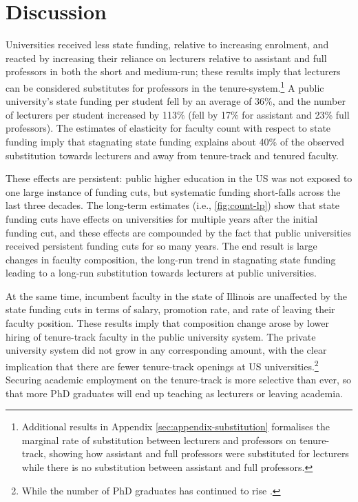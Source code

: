 \section{Discussion}
\label{sec:discussion}

Universities received less state funding, relative to increasing enrolment, and reacted by increasing their reliance on lecturers relative to assistant and full professors in both the short and medium-run; these results imply that lecturers can be considered substitutes for professors in the tenure-system.\footnote{
    Additional results in Appendix \autoref{sec:appendix-substitution} formalises the marginal rate of substitution between lecturers and professors on tenure-track, showing how assistant and full professors were substituted for lecturers while there is no substitution between assistant and full professors.
}
A public university's state funding per student fell by an average of 36\%, and the number of lecturers per student increased by 113\% (fell by 17\% for assistant and 23\% full professors).
The estimates of elasticity for faculty count with respect to state funding imply that stagnating state funding explains about 40\% of the observed substitution towards lecturers and away from tenure-track and tenured faculty.

These effects are persistent: public higher education in the US was not exposed to one large instance of funding cuts, but systematic funding short-falls across the last three decades.
The long-term estimates (i.e., \autoref{fig:count-lp}) show that state funding cuts have effects on universities for multiple years after the initial funding cut, and these effects are compounded by the fact that public universities received persistent funding cuts for so many years.
The end result is large changes in faculty composition, the long-run trend in stagnating state funding leading to a long-run substitution towards lecturers at public universities.

At the same time, incumbent faculty in the state of Illinois are unaffected by the state funding cuts in terms of salary, promotion rate, and rate of leaving their faculty position.
These results imply that composition change arose by lower hiring of tenure-track faculty in the public university system.
The private university system did not grow in any corresponding amount, with the clear implication that there are fewer tenure-track openings at US universities.\footnote{
    While the number of PhD graduates has continued to rise \citep{aau2021survey}.
}
Securing academic employment on the tenure-track is more selective than ever, so that more PhD graduates will end up teaching as lecturers or leaving academia.

